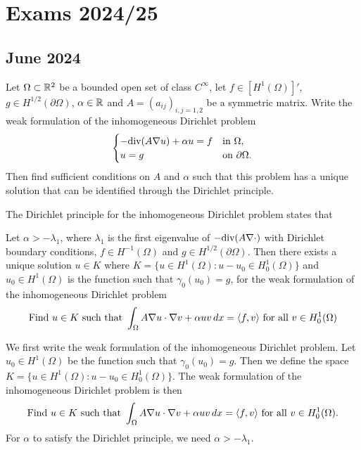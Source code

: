 \section{Exams 2024/25}
\subsection{June 2024}
\begin{exercise}
    Let \(\Omega \subset \mathbb{R}^2\) be a bounded open set of class \(C^\infty\), let \(f \in \left[H^1(\Omega)\right]'\), \(g \in H^{1/2}(\partial \Omega)\), \(\alpha \in \mathbb{R}\) and \(A = (a_{ij})_{i, j=1,2}\) be a symmetric matrix. Write the weak formulation of the inhomogeneous Dirichlet problem
    \[
        \begin{cases}
            -\text{div}(A \nabla u) + \alpha u = f & \text{in } \Omega, \\
            u = g & \text{on } \partial \Omega.
        \end{cases}
    \]
    Then find sufficient conditions on \(A\) and \(\alpha\) such that this problem has a unique solution that can be identified through the Dirichlet principle.
    \end{exercise}
    The Dirichlet principle for the inhomogeneous Dirichlet problem states that 
    \begin{remark}
        Let \(\alpha > -\lambda_1\), where \(\lambda_1\) is the first eigenvalue of \(-\text{div}(A \nabla \cdot)\) with Dirichlet boundary conditions, \(f \in H^{-1}(\Omega)\) and \(g \in H^{1/2}(\partial \Omega)\). Then there exists a unique solution \(u \in K\) where \(K = \{u \in H^1(\Omega) : u-u_0 \in H^1_0(\Omega)\}\) and \(u_0 \in H^1(\Omega)\) is the function such that \(\gamma_0(u_0) = g\), for the weak formulation of the inhomogeneous Dirichlet problem
        \[
            \begin{split}
                \text{Find } u \in K \text{ such that } \int_\Omega A \nabla u \cdot \nabla v + \alpha u v \, dx = \langle f, v \rangle \text{ for all } v \in H^1_0(\Omega)
            \end{split}
        \]
    \end{remark}
    We first write the weak formulation of the inhomogeneous Dirichlet problem. Let \(u_0 \in H^1(\Omega)\) be the function such that \(\gamma_0(u_0) = g\). Then we define the space \(K = \{u \in H^1(\Omega) : u-u_0 \in H^1_0(\Omega)\}\). The weak formulation of the inhomogeneous Dirichlet problem is then
    \[
        \begin{split}
            \text{Find } u \in K \text{ such that } \int_\Omega A \nabla u \cdot \nabla v + \alpha u v \, dx = \langle f, v \rangle \text{ for all } v \in H^1_0(\Omega).
        \end{split}
    \]
    For \(\alpha\) to satisfy the Dirichlet principle, we need \(\alpha > -\lambda_1\).

